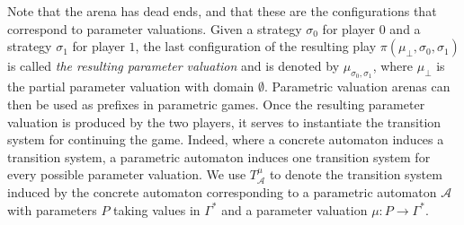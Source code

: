 \documentclass[a4paper,UKenglish,cleveref, autoref, thm-restate]{lipics-v2021}
\renewcommand{\A}{\mathcal{A}}
\begin{document}
Note that the arena has dead ends, and that these are the configurations that correspond to parameter valuations.
Given a strategy $\sigma_0$ for player $0$ and a strategy $\sigma_1 $ for player $1$,
the last configuration of the resulting play $\pi(\mu_\bot,\sigma_0, \sigma_1)$
is called {\em the resulting parameter valuation}
 and is denoted by $\mu_{\sigma_0, \sigma_1}$, where 
 $\mu_\bot$ is the partial parameter valuation with domain $\emptyset$. 
Parametric valuation arenas can then be used as prefixes in parametric games. Once the resulting parameter valuation is produced by the two players, it serves to instantiate the transition system for continuing the game.
%
%
Indeed, where a concrete automaton induces a transition system, a parametric automaton induces one transition system for every possible parameter valuation.
We use $T^\mu_\A$ to denote the transition system induced by the concrete automaton corresponding to
a parametric automaton $\A$ with parameters $P$ taking values in $\Gamma^*$ and a parameter valuation $\mu: P \to \Gamma^*$.
\end{document}
